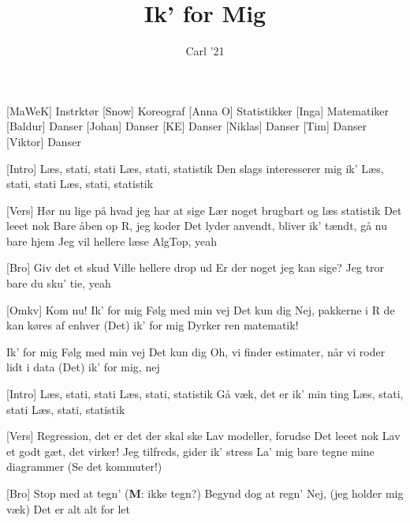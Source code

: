 \documentclass[a4paper,11pt]{article}
\title{Ik' for Mig}
\author{Carl '21}
\begin{document}
\maketitle

\begin{roles}
[MaWeK] Instrktør
[Snow] Koreograf
[Anna O] Statistikker
[Inga] Matematiker
[Baldur] Danser
[Johan] Danser
[KE] Danser
[Niklas] Danser
[Tim] Danser
[Viktor] Danser
\end{roles}

\begin{song}
  [Intro]%
  Læs, stati, stati
  				  Læs, stati, statistik 
  Den slags interesserer mig ik'
  Læs, stati, stati
  				 Læs, stati, statistik 
  
  [Vers]%
  Hør nu lige på hvad jeg har at sige
  				Lær noget brugbart og læs statistik
  				Det leeet nok
  				Bare åben op R, jeg koder	
  Det lyder anvendt, bliver ik' tændt, gå nu bare hjem
  				Jeg vil hellere læse AlgTop, yeah
  				
  [Bro]%
  Giv det et skud
  Ville hellere drop ud
  Er der noget jeg kan sige?
  Jeg tror bare du sku' tie, yeah
  
  [Omkv]%
  Kom nu!
  Ik' for mig
  Følg med min vej
  Det kun dig
  Nej, pakkerne i R de kan køres af enhver
  (Det) ik' for mig
  				 Dyrker ren matematik!
  
  Ik' for mig
  Følg med min vej
  Det kun dig
  Oh, vi finder estimater, når vi roder lidt i data
  (Det) ik' for mig, nej

  [Intro]%
  Læs, stati, stati
  				 Læs, stati, statistik 
  Gå væk, det er ik' min ting
  Læs, stati, stati
  				 Læs, stati, statistik 
  				 
  [Vers]%
  Regression, det er det der skal ske
  				Lav modeller, forudse
  				Det leeet nok
  				Lav et godt gæt, det virker!		
  Jeg tilfreds, gider ik' stress
  				La' mig bare tegne mine diagrammer
  				(Se det kommuter!)
  				
  [Bro]%
  Stop med at tegn' (\textbf{M}: ikke tegn?)
  				Begynd dog at regn'
  Nej, (jeg holder mig væk)
  				Det er alt alt for let
  

\end{song}
\end{document}
